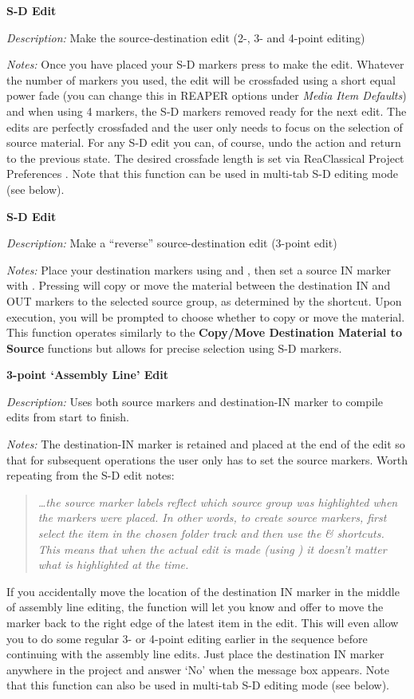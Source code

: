 \documentclass[10pt,american]{article}
\begin{document}
\textbf{S-D Edit }

\emph{Description:} Make the source-destination edit (2-, 3- and 4-point
editing)

\emph{Notes: }Once you have placed your S-D markers press  to make the
edit. Whatever the number of markers you used, the edit will be crossfaded using
a short equal power fade (you can change this in REAPER options under
\emph{Media Item Defaults}) and when using 4 markers, the S-D markers removed
ready for the next edit. The edits are perfectly crossfaded and the user only
needs to focus on the selection of source material. For any S-D edit you can, of
course, undo the action and return to the previous state. The desired crossfade
length is set via ReaClassical Project Preferences  . Note that this
function can be used in multi-tab S-D editing mode (see below).

\textbf{S-D Edit }

\emph{Description:} Make a ``reverse'' source-destination edit (3-point edit)

\emph{Notes: }Place your destination markers using  and , then set a source IN
marker with . Pressing  will copy or move the material between
the destination IN and OUT markers to the selected source group, as determined
by the  shortcut. Upon execution, you will be prompted to choose whether
to copy or move the material. This function operates similarly to the
\textbf{Copy/Move Destination Material to Source} functions but allows for
precise selection using S-D markers.

\textbf{3-point `Assembly Line' Edit }

\emph{Description:} Uses both source markers and destination-IN marker to
compile edits from start to finish.

\emph{Notes: }The destination-IN marker is retained and placed at the end of the
edit so that for subsequent operations the user only has to set the source
markers. Worth repeating from the S-D edit notes: 
\begin{quote}
\emph{\dots the source marker labels reflect which source group was highlighted
when the markers were placed. In other words, to create source markers, first
select the item in the chosen folder track and then use the }\emph{ \&
}\emph{ shortcuts. This means that when the actual edit is made (using
} \emph{) it doesn't matter what is highlighted at the time.}
\end{quote}
If you accidentally move the location of the destination IN marker in the middle
of assembly line editing, the function will let you know and offer to move the
marker back to the right edge of the latest item in the edit. This will even
allow you to do some regular 3- or 4-point editing earlier in the sequence
before continuing with the assembly line edits. Just place the destination IN
marker anywhere in the project and answer `No' when the message box appears.
Note that this function can also be used in multi-tab S-D editing mode (see
below).
\end{document}
